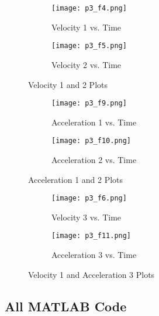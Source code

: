 \documentclass{article}
\begin{document}
    \begin{figure}[h]
    \centering
    \begin{subfigure}{.5\textwidth}
      \centering
      \texttt{[image: p3\_f4.png]}
      \caption{Velocity 1 vs. Time}
      \label{fig:sub1}
    \end{subfigure}%
    \begin{subfigure}{.5\textwidth}
      \centering
      \texttt{[image: p3\_f5.png]}
      \caption{Velocity 2 vs. Time}
      \label{fig:sub2}
    \end{subfigure}
    \caption{Velocity 1 and 2 Plots}
    \label{fig:test}
    \end{figure}
    
\clearpage

    \begin{figure}[h]
    \centering
    \begin{subfigure}{.5\textwidth}
      \centering
      \texttt{[image: p3\_f9.png]}
      \caption{Acceleration 1 vs. Time}
      \label{fig:sub1}
    \end{subfigure}%
    \begin{subfigure}{.5\textwidth}
      \centering
      \texttt{[image: p3\_f10.png]}
      \caption{Acceleration 2 vs. Time}
      \label{fig:sub2}
    \end{subfigure}
    \caption{Acceleration 1 and 2 Plots}
    \label{fig:test}
    \end{figure}
    
    \begin{figure}[h]
    \centering
    \begin{subfigure}{.5\textwidth}
      \centering
      \texttt{[image: p3\_f6.png]}
      \caption{Velocity 3 vs. Time}
      \label{fig:sub1}
    \end{subfigure}%
    \begin{subfigure}{.5\textwidth}
      \centering
      \texttt{[image: p3\_f11.png]}
      \caption{Acceleration 3 vs. Time}
      \label{fig:sub2}
    \end{subfigure}
    \caption{Velocity 1 and Acceleration 3 Plots}
    \label{fig:test}
    \end{figure}

\subsection{All MATLAB Code}


\end{document}
